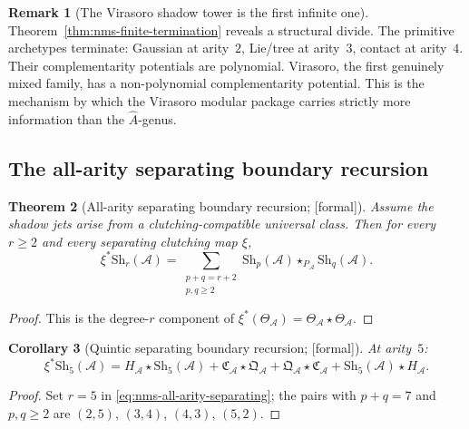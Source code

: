 \documentclass[11pt,oneside]{memoir}
\numberwithin{equation}{chapter}
\newtheorem{theorem}{Theorem}[chapter]
\newtheorem{corollary}[theorem]{Corollary}
\theoremstyle{definition}
\newtheorem{remark}[theorem]{Remark}
\newcommand{\ClaimStatusProvedHere}{\textnormal{[formal]}}
\newcommand{\cA}{\mathcal A}
\begin{document}
\begin{remark}[The Virasoro shadow tower is the first infinite one]
\label{rem:nms-virasoro-infinite-tower}
Theorem~\ref{thm:nms-finite-termination} reveals a structural divide.  The primitive archetypes terminate: Gaussian at arity~$2$, Lie/tree at arity~$3$, contact at arity~$4$.  Their complementarity potentials are polynomial.  Virasoro, the first genuinely mixed family, has a non-polynomial complementarity potential.  This is the mechanism by which the Virasoro modular package carries strictly more information than the $\hat{A}$-genus.
\end{remark}

\subsection{The all-arity separating boundary recursion}
\label{subsec:nms-all-arity-separating}

\begin{theorem}[All-arity separating boundary recursion; \ClaimStatusProvedHere]
\label{thm:nms-all-arity-separating-boundary}
Assume the shadow jets arise from a clutching-compatible universal class.  Then for every $r\ge 2$ and every separating clutching map $\xi$,
\begin{equation}
\label{eq:nms-all-arity-separating}
\xi^*\mathrm{Sh}_r(\cA)
=
\sum_{\substack{p+q=r+2 \\ p,q\ge 2}}
\mathrm{Sh}_p(\cA)\star_{P_{\cA}}\mathrm{Sh}_q(\cA).
\end{equation}
\end{theorem}

\begin{proof}
This is the degree-$r$ component of $\xi^*(\Theta_{\cA})=\Theta_{\cA}\star\Theta_{\cA}$.\qedhere
\end{proof}

\begin{corollary}[Quintic separating boundary recursion; \ClaimStatusProvedHere]
\label{cor:nms-quintic-separating-boundary}
At arity~$5$:
\[
\xi^*\mathrm{Sh}_5(\cA)
=
H_{\cA}\star \mathrm{Sh}_5(\cA)
+
\mathfrak C_{\cA}\star \mathfrak Q_{\cA}
+
\mathfrak Q_{\cA}\star \mathfrak C_{\cA}
+
\mathrm{Sh}_5(\cA)\star H_{\cA}.
\]
\end{corollary}

\begin{proof}
Set $r=5$ in \eqref{eq:nms-all-arity-separating}; the pairs with $p+q=7$ and $p,q\ge 2$ are $(2,5)$, $(3,4)$, $(4,3)$, $(5,2)$.\qedhere
\end{proof}
\end{document}
